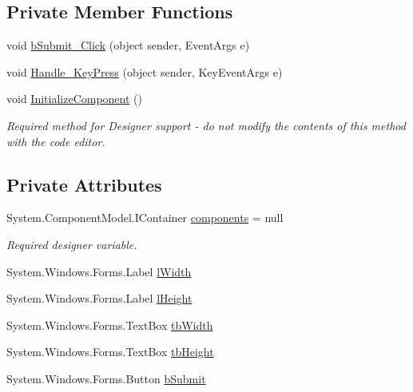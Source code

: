 \subsection*{Private Member Functions}
\begin{DoxyCompactItemize}
\item 
void \mbox{\hyperlink{class_paint___program_1_1_new_project_form_aa43d720d3ebb5f1dbb1ee6dcc2c714c8}{b\+Submit\+\_\+\+Click}} (object sender, Event\+Args e)
\item 
void \mbox{\hyperlink{class_paint___program_1_1_new_project_form_a04b3a294a9113ed06ecfa74192e42958}{Handle\+\_\+\+Key\+Press}} (object sender, Key\+Event\+Args e)
\item 
void \mbox{\hyperlink{class_paint___program_1_1_new_project_form_ae85795537ab7ad2b2bf2775510e260ba}{Initialize\+Component}} ()
\begin{DoxyCompactList}\small\item\em Required method for Designer support -\/ do not modify the contents of this method with the code editor. \end{DoxyCompactList}\end{DoxyCompactItemize}
\subsection*{Private Attributes}
\begin{DoxyCompactItemize}
\item 
System.\+Component\+Model.\+I\+Container \mbox{\hyperlink{class_paint___program_1_1_new_project_form_abac36a8b7050e7b6024c69bff809c5c0}{components}} = null
\begin{DoxyCompactList}\small\item\em Required designer variable. \end{DoxyCompactList}\item 
System.\+Windows.\+Forms.\+Label \mbox{\hyperlink{class_paint___program_1_1_new_project_form_ae759110ede1404912e21e9385f6a4572}{l\+Width}}
\item 
System.\+Windows.\+Forms.\+Label \mbox{\hyperlink{class_paint___program_1_1_new_project_form_a1154f326067af764865f0c82efee2992}{l\+Height}}
\item 
System.\+Windows.\+Forms.\+Text\+Box \mbox{\hyperlink{class_paint___program_1_1_new_project_form_a56fe3a72511892792928d3f350a2835f}{tb\+Width}}
\item 
System.\+Windows.\+Forms.\+Text\+Box \mbox{\hyperlink{class_paint___program_1_1_new_project_form_a27613df56889f1978b5c3fbed6aea1ee}{tb\+Height}}
\item 
System.\+Windows.\+Forms.\+Button \mbox{\hyperlink{class_paint___program_1_1_new_project_form_a7601a0b6fc14d0b1ec52e98cd492cfda}{b\+Submit}}
\end{DoxyCompactItemize}


